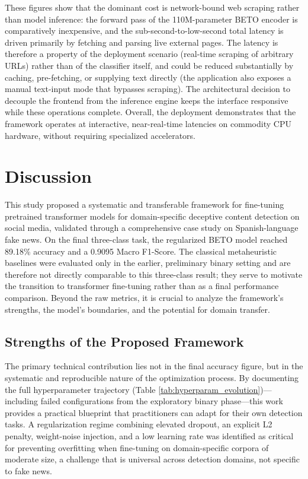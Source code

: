 \documentclass[informatics,article,submit,pdftex,moreauthors]{Definitions/mdpi}
\begin{document}
These figures show that the dominant cost is network-bound web scraping rather than model inference: the forward pass of the 110M-parameter BETO encoder is comparatively inexpensive, and the sub-second-to-low-second total latency is driven primarily by fetching and parsing live external pages. The latency is therefore a property of the deployment scenario (real-time scraping of arbitrary URLs) rather than of the classifier itself, and could be reduced substantially by caching, pre-fetching, or supplying text directly (the application also exposes a manual text-input mode that bypasses scraping). The architectural decision to decouple the frontend from the inference engine keeps the interface responsive while these operations complete. Overall, the deployment demonstrates that the framework operates at interactive, near-real-time latencies on commodity CPU hardware, without requiring specialized accelerators.

\section{Discussion}

This study proposed a systematic and transferable framework for fine-tuning pretrained transformer models for domain-specific deceptive content detection on social media, validated through a comprehensive case study on Spanish-language fake news. On the final three-class task, the regularized BETO model reached 89.18\% accuracy and a 0.9095 Macro F1-Score. The classical metaheuristic baselines were evaluated only in the earlier, preliminary binary setting and are therefore not directly comparable to this three-class result; they serve to motivate the transition to transformer fine-tuning rather than as a final performance comparison. Beyond the raw metrics, it is crucial to analyze the framework's strengths, the model's boundaries, and the potential for domain transfer.

\subsection{Strengths of the Proposed Framework}
The primary technical contribution lies not in the final accuracy figure, but in the systematic and reproducible nature of the optimization process. By documenting the full hyperparameter trajectory (Table \ref{tab:hyperparam_evolution})—including failed configurations from the exploratory binary phase—this work provides a practical blueprint that practitioners can adapt for their own detection tasks. A regularization regime combining elevated dropout, an explicit L2 penalty, weight-noise injection, and a low learning rate was identified as critical for preventing overfitting when fine-tuning on domain-specific corpora of moderate size, a challenge that is universal across detection domains, not specific to fake news.
\end{document}
